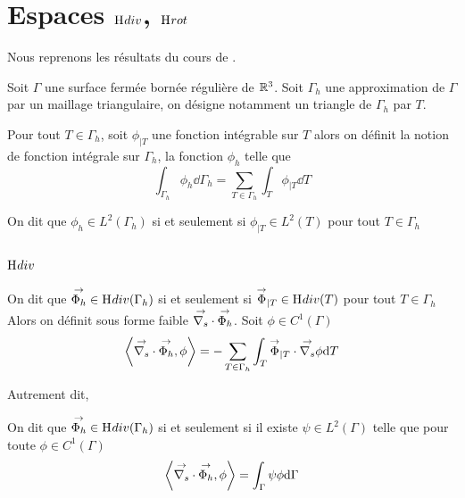 \section[Espaces Hdiv Hrot]{Espaces \(\mathrm{H}_\mathrm{{}}{div}\), \(\mathrm{H}_\mathrm{{}}{rot}\)}

Nous reprenons les résultats du cours de \cite{bendali_equations_2014}.

Soit \(\Gamma\) une surface fermée bornée régulière de \(\mathbb R^3\). 
Soit \(\Gamma_h\) une approximation de \(\Gamma\) par un maillage triangulaire, on désigne notamment un triangle de \(\Gamma_h\) par \(T\).

\begin{defn}
    Pour tout \(T \in \Gamma_h\), soit \(\phi_{|T}\) une fonction intégrable sur \(T\) alors
    on définit la notion de fonction intégrale sur \(\Gamma_h\), la fonction \(\phi_h\) telle que
    \begin{equation}
        \int_{\Gamma_h} \phi_h \dd{\Gamma_h} = \sum_{T\in\Gamma_h} \int_T \phi_{|T} \dd{T}
    \end{equation}
\end{defn}

\begin{defn}
    On dit que \(\phi_h \in L^2(\Gamma_h)\) si et seulement si \(\phi_{|T} \in L^2(T)\) pour tout \(T \in \Gamma_h\)
\end{defn}

\subsection[Hdiv]{\(\mathrm{H}_\mathrm{{}}{div}\)}

\begin{defn}
    On dit que \({\overset{\rightarrow}{\Phi_h}} \in \mathrm{H}_\mathrm{{}}{div}(\Gamma_h)\) si et seulement si \({\overset{\rightarrow}{\Phi}}_{|T} \in \mathrm{H}_\mathrm{{}}{div}(T)\) pour tout \(T \in \Gamma_h\)
    Alors on définit sous forme faible \({\overset{\rightarrow}{\nabla_s}} \cdot {\overset{\rightarrow}{\Phi_h}} \).
    Soit \(\phi \in C^1(\Gamma)\) 
    \begin{equation}
        \left< \vdivs \vect{\Phi_h}, \phi \right> %
        = - \sum_{T\in\Gamma_h} \int_T \vect{\Phi}_{|T} \cdot \vgrads \phi\dd{T}
    \end{equation}
\end{defn}

Autrement dit, \cite[eq.~5.3]{bendali_equations_2014}
\begin{defn}
    On dit que \({\overset{\rightarrow}{\Phi_h}} \in \mathrm{H}_\mathrm{{}}{div}(\Gamma_h)\) si et seulement si il existe \(\psi\in L^2(\Gamma)\) telle que pour toute \(\phi \in C^1(\Gamma)\) 
    \begin{equation}
        \left< {\overset{\rightarrow}{\nabla_s}} \cdot {\overset{\rightarrow}{\Phi_h}}, \phi \right> = \int_\Gamma \psi \phi \mathrm{d}{\Gamma}
    \end{equation}
\end{defn}

